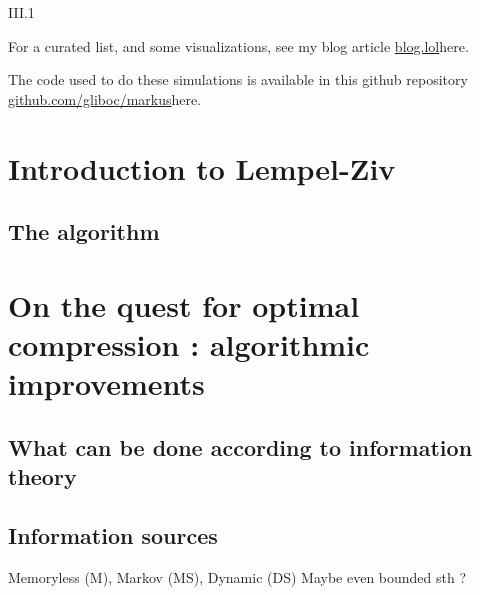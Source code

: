 
\tableofcontents

\newpage

\Indications
\medskip


\begin{indications}{III.1} %

\item[III.1] For a curated list, and some visualizations, see my blog
             article \url{blog.lol}{here}.

\item[III.2] The code used to do these simulations is available 
    in this github repository \url{github.com/gliboc/markus}{here}.


\end{indications}


\newpage


\section*{Introduction to Lempel-Ziv}
    \subsection*{The algorithm}

\section{On the quest for optimal compression : algorithmic improvements}
    \subsection{What can be done according to information theory}
    \subsection{Information sources}
        Memoryless (M), Markov (MS), Dynamic (DS)
        Maybe even bounded sth ?
